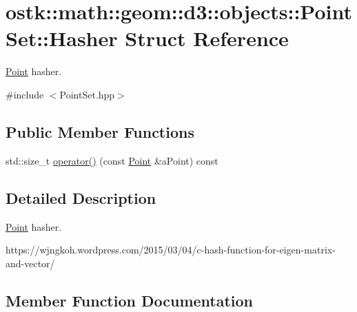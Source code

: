 \hypertarget{structostk_1_1math_1_1geom_1_1d3_1_1objects_1_1_point_set_1_1_hasher}{}\section{ostk\+:\+:math\+:\+:geom\+:\+:d3\+:\+:objects\+:\+:Point\+Set\+:\+:Hasher Struct Reference}
\label{structostk_1_1math_1_1geom_1_1d3_1_1objects_1_1_point_set_1_1_hasher}


\hyperlink{classostk_1_1math_1_1geom_1_1d3_1_1objects_1_1_point}{Point} hasher.  




{\ttfamily \#include $<$Point\+Set.\+hpp$>$}

\subsection*{Public Member Functions}
\begin{DoxyCompactItemize}
\item 
std\+::size\+\_\+t \hyperlink{structostk_1_1math_1_1geom_1_1d3_1_1objects_1_1_point_set_1_1_hasher_a9c6a014f60370ae65d31e65c132f772f}{operator()} (const \hyperlink{classostk_1_1math_1_1geom_1_1d3_1_1objects_1_1_point}{Point} \&a\+Point) const
\end{DoxyCompactItemize}


\subsection{Detailed Description}
\hyperlink{classostk_1_1math_1_1geom_1_1d3_1_1objects_1_1_point}{Point} hasher. 

https\+://wjngkoh.wordpress.\+com/2015/03/04/c-\/hash-\/function-\/for-\/eigen-\/matrix-\/and-\/vector/ 

\subsection{Member Function Documentation}
\mbox{\label{structostk_1_1math_1_1geom_1_1d3_1_1objects_1_1_point_set_1_1_hasher_a9c6a014f60370ae65d31e65c132f772f}} 
